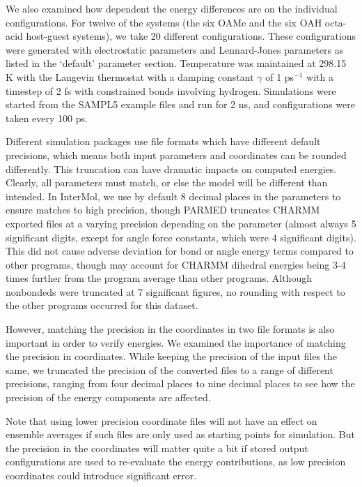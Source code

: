 We also examined how dependent the energy differences are on the
individual configurations. For twelve of the systems (the six OAMe and
the six OAH octa-acid host-guest systems), we take 20 different
configurations. These configurations were generated with electrostatic
parameters and Lennard-Jones parameters as listed in the `default'
parameter section. Temperature was maintained at 298.15 K with the
Langevin thermostat with a damping constant $\gamma$ of 1 ps$^{-1}$
with a timestep of 2 fs with constrained bonds involving
hydrogen. Simulations were started from the SAMPL5 example files and
run for 2 ns, and configurations were taken every 100 ps.

Different simulation packages use file formats which have different
default precisions, which means both input parameters and coordinates
can be rounded differently. This truncation can have dramatic impacts
on computed energies. Clearly, all parameters must match, or else the
model will be different than intended. In InterMol, we use by default
8 decimal places in the parameters to ensure matches to high
precision, though PARMED truncates CHARMM exported files at a varying
precision depending on the parameter (almost always 5 significant
digits, except for angle force constants, which were 4 significant
digits). This did not cause adverse deviation for bond or angle energy
terms compared to other programs, though may account for CHARMM
dihedral energies being 3-4 times further from the program average
than other programs. Although nonbondeds were truncated at 7
significant figures, no rounding with respect to the other programs
occurred for this dataset.

However, matching the precision in the coordinates in two file formats
is also important in order to verify energies. We examined the
importance of matching the precision in coordinates.  While keeping
the precision of the input files the same, we truncated the precision
of the converted files to a range of different precisions, ranging
from four decimal places to nine decimal places to see how the
precision of the energy components are affected.
 
Note that using lower precision coordinate files will not have an
effect on ensemble averages if such files are only used as starting
points for simulation. But the precision in the coordinates will
matter quite a bit if stored output configurations are used to
re-evaluate the energy contributions, as low precision coordinates could introduce
significant error.

